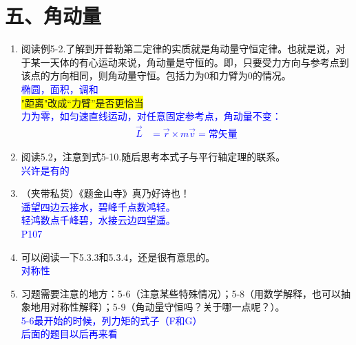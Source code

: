 \documentclass[12pt,a4paper]{article}
\begin{document}
\section{五、角动量}
\begin{enumerate}[label=\arabic*.,leftmargin=*]
    \item 阅读例5-2.了解到开普勒第二定律的实质就是角动量守恒定律。也就是说，对于某一天体的有心运动来说，角动量是守恒的。即，只要受力方向与参考点到该点的方向相同，则角动量守恒。包括力为0和力臂为0的情况。
    \textcolor{blue}{\\椭圆，面积，调和}\\
    \colorbox{yellow}{"距离"改成“力臂”是否更恰当}
    \textcolor{blue}{\\力为零，如匀速直线运动，对任意固定参考点，角动量不变：
\begin{align*}
\vec{L} &= \vec{r} \times m\vec{v} = \text{常矢量}
\end{align*}}
    \item 阅读5.2，注意到式5-10.随后思考本式子与平行轴定理的联系。
\textcolor{blue}{\\兴许是有的}
    \item （夹带私货）《题金山寺》真乃好诗也！
\textcolor{blue}{\\遥望四边云接水，碧峰千点数鸿轻。
\\轻鸿数点千峰碧，水接云边四望遥。
\\P107}
    \item 可以阅读一下5.3.3和5.3.4，还是很有意思的。
\textcolor{blue}{\\对称性}
    \item 习题需要注意的地方：5-6（注意某些特殊情况）；5-8（用数学解释，也可以抽象地用对称性解释）；5-9（角动量守恒吗？关于哪一点呢？）。
\textcolor{blue}{\\5-6最开始的时候，列力矩的式子（F和G）
\\后面的题目以后再来看}
\end{enumerate}
\end{document}

